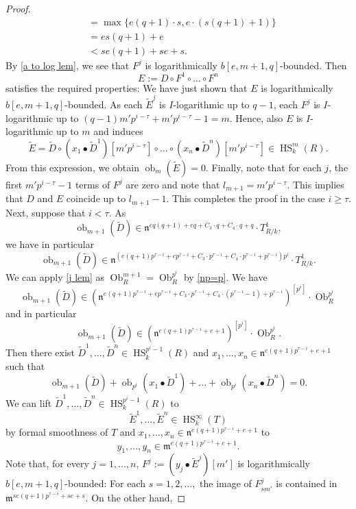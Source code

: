\documentclass{amsart}
\newcommand{\HS}{\operatorname{HS}}
\begin{document}
\begin{proof}
\begin{align*}
   &=\max\{ e(q+1)\cdot s,e\cdot (s(q+1)+1)\}\\
   &=es(q+1)+e\\
   &<se(q+1)+se+s.
    \end{align*}
    By \ref{a to log lem}, we see that $F^j$ is logarithmically $b[e,m+1,q]$-bounded. Then
    $$E:=D\circ F^1\circ\dots\circ F^n$$
    satisfies the required properties: We have just shown that $E$ is logarithmically $b[e,m+1,q]$-bounded. As each $\widetilde{E}^j$ is $I$-logarithmic up to $q-1$, each $F^j$ is $I$-logarithmic up to $(q-1)m'p^{i-\tau}+m'p^{i-\tau}-1=m$. Hence, also $E$ is $I$-logarithmic up to $m$ and induces
    $$\widetilde{E}=\widetilde{D}\circ (x_1\bullet \widetilde{D}^1)[m'p^{i-\tau}]\circ\dots \circ (x_n\bullet \widetilde{D}^n)[m'p^{i-\tau}] \in \HS^m_k(R).$$
    From this expression, we obtain $\operatorname{ob}_m(\widetilde{E})=0$. Finally, note that for each $j$, the first $m'p^{i-\tau}-1$ terms of $F^j$ are zero
    and note that $l_{m+1}=m'p^{i-\tau}$. This implies that $D$ and $E$ coincide up to $l_{m+1}-1$. This completes the proof in the case $i\ge \tau$.\\
    Next, suppose that $i<\tau $.
    As $$\operatorname{ob}_{m+1}(\widetilde{D})\in \mathfrak{n}^{eq(q+1)+eq+C_3\cdot q+C_4\cdot q+q}\cdot T^1_{R/k},$$ we have in particular
    $$\operatorname{ob}_{m+1}(\widetilde{D})\in \mathfrak{n}^{(e(q+1)p^{\tau-i}+ep^{\tau-i}+C_3\cdot p^{\tau-i}+C_4\cdot p^{\tau-i}+p^{\tau-i})p^i}\cdot T^1_{R/k}.$$
    We can apply \ref{j lem} as $\operatorname{Ob}_R^{m+1}=\operatorname{Ob}_R^{p^i}$ by \ref{np=p}. We have
    $$\operatorname{ob}_{m+1}(\widetilde{D})\in (\mathfrak{n}^{e(q+1)p^{\tau-i}+ep^{\tau-i}+C_3\cdot p^{\tau-i}+C_4\cdot (p^{\tau-i}-1)+p^{\tau-i}})^{[p^i]}\cdot  \operatorname{Ob}_R^{p^i}$$
    and in particular
    $$\operatorname{ob}_{m+1}(\widetilde{D})\in (\mathfrak{n}^{e(q+1)p^{\tau-i}+e+1})^{[p^i]}\cdot  \operatorname{Ob}_R^{p^i}.$$
    Then there exist $\widetilde{D}^1,\dots,\widetilde{D}^n\in \HS_k^{p^i-1}(R)$ and $x_1,\dots,x_n\in \mathfrak{n}^{e(q+1)p^{\tau-i}+e+1}$ such that 
    $$\operatorname{ob}_{m+1}(\widetilde{D})+\operatorname{ob}_{p^i}(x_1\bullet\widetilde{D}^1)+\dots + \operatorname{ob}_{p^i}(x_n\bullet\widetilde{D}^n)=0.$$ We can lift $\widetilde{D}^1,\dots,\widetilde{D}^n\in \HS_k^{p^i-1}(R)$ to $$\widetilde{E}^1,\dots,\widetilde{E}^n\in \HS_k^\infty(T)$$ by formal smoothness of $T$ and $x_1,\dots,x_n\in \mathfrak{n}^{e(q+1)p^{\tau-i}+e+1}$ to $$y_1,\dots,y_n\in \mathfrak{m}^{e(q+1)p^{\tau-i}+e+1}.$$
    Note that, for every $j=1,\dots,n$, $F^j:=(y_j\bullet \widetilde{E}^j)[m']$ is logarithmically $b[e,m+1,q]$-bounded: For each $s=1,2,\dots,$ the image of $F^j_{sm'}$ is contained in $\mathfrak{m}^{se(q+1)p^{\tau-i}+se+s}$. On the other hand,

\end{proof}
\end{document}
